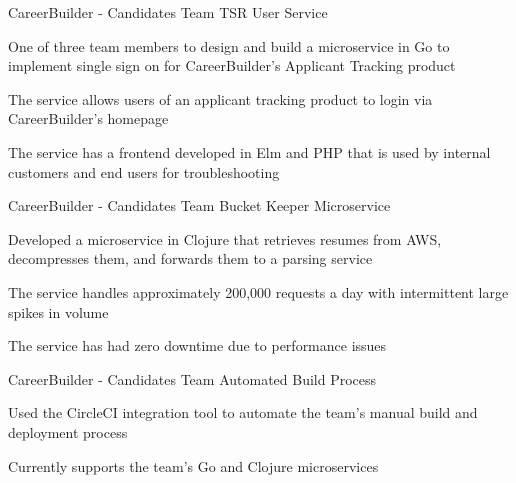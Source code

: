 \begin{cventries}
\cventry
  	{CareerBuilder - Candidates Team} %
    {TSR User Service} %
    {} %
    {} %
    {
      \begin{cvitems} %
        \item {One of three team members to design and build a microservice in Go to implement single sign on for CareerBuilder's Applicant Tracking product}  
        \item {The service allows users of an applicant tracking product to login via CareerBuilder's homepage}
        \item {The service has a frontend developed in Elm and PHP that is used by internal customers and end users for troubleshooting} 
      \end{cvitems}
    }

  \cventry
  	{CareerBuilder - Candidates Team} %
    {Bucket Keeper Microservice} %
    {} %
    {} %
    {
      \begin{cvitems} %
        \item {Developed a microservice in Clojure that retrieves resumes from AWS, decompresses them, and forwards them to a parsing service}  
        \item {The service handles approximately 200,000 requests a day with intermittent large spikes in volume}
        \item {The service has had zero downtime due to performance issues} 
      \end{cvitems}
    }

  \cventry
   	{CareerBuilder - Candidates Team} %
    {Automated Build Process} %
    {} %
    {} %
    {
      \begin{cvitems} %
        \item {Used the CircleCI integration tool to automate the team's manual build and deployment process}
        \item {Currently supports the team's Go and Clojure microservices}
    	\end{cvitems}
	}
    

\end{cventries}
